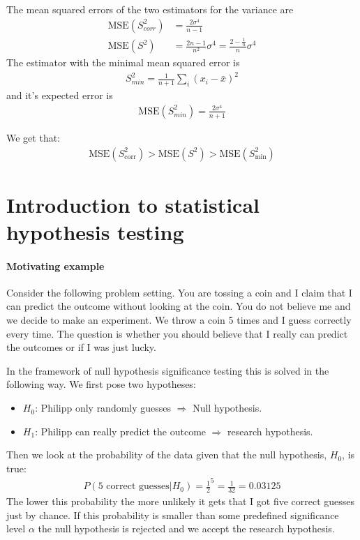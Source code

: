 The mean squared errors of the two estimators for the variance are
\begin{align}
  \text{MSE}(S_{corr}^2) &= \frac{2\sigma^4}{n-1}\\
  \text{MSE}(S^2) &= \frac{2n-1}{n^2}\sigma^4 = \frac{2-\frac{1}{n}}{n}\sigma^4  
\end{align}
The estimator with the minimal mean squared error is
\begin{align}
  S_{min}^2 = \frac{1}{n+1}\sum_{i}(x_{i}-\bar{x})^2  
\end{align} and it's expected error is
\begin{align}
  \text{MSE}(S_{min}^2) = \frac{2\sigma^4}{n+1}  
\end{align}

We get that:
\begin{align}
  \text{MSE}(S_{\text{corr}}^2) > \text{MSE}(S^2) > \text{MSE}(S_{\text{min}}^2) 
\end{align}
 


\section {Introduction to statistical hypothesis testing}
\paragraph{Motivating example} Consider the following problem setting.
You are tossing a coin and I claim that I can predict the outcome without looking at the coin.
You do not believe me and we decide to make an experiment.
We throw a coin 5 times and I guess correctly every time.
The question is whether you should believe that I really can predict the outcomes or if I was just lucky.

In the framework of null hypothesis significance testing this is solved in the following way.
We first pose two hypotheses:
\begin{itemize}
  \item $H_{0}$: Philipp only randomly guesses $\Rightarrow$  Null hypothesis.
  \item $H_{1}$: Philipp can really predict the outcome $\Rightarrow$ research hypothesis.
\end{itemize}

Then we look at the probability of the data given that the null hypothesis, $H_0$, is true:
\begin{align}
  P(\text{5 correct guesses}| H_{0}) = \frac{1}{2}^5 = \frac{1}{32} = 0.03125
\end{align}
The lower this probability the more unlikely it gets that I got five correct guesses just by chance.
If this probability is smaller than some predefined significance level $\alpha$
the null hypothesis is rejected and we accept the research hypothesis.

